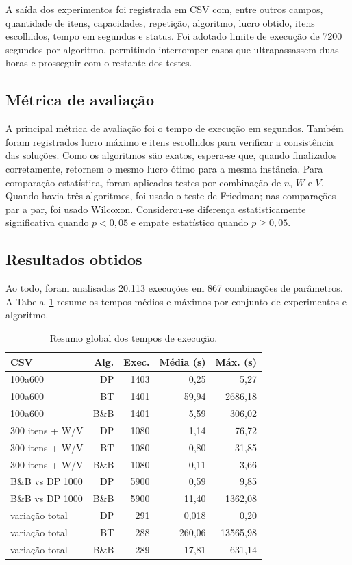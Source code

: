 \documentclass[
    12pt,
    oneside,
    a4paper,
    brazil,
    article
]{abntex2}
\begin{document}
A saída dos experimentos foi registrada em CSV com, entre outros campos, quantidade de itens, capacidades, repetição, algoritmo, lucro obtido, itens escolhidos, tempo em segundos e status. Foi adotado limite de execução de 7200 segundos por algoritmo, permitindo interromper casos que ultrapassassem duas horas e prosseguir com o restante dos testes.

\subsection{Métrica de avaliação}

A principal métrica de avaliação foi o tempo de execução em segundos. Também foram registrados lucro máximo e itens escolhidos para verificar a consistência das soluções. Como os algoritmos são exatos, espera-se que, quando finalizados corretamente, retornem o mesmo lucro ótimo para a mesma instância. Para comparação estatística, foram aplicados testes por combinação de $n$, $W$ e $V$. Quando havia três algoritmos, foi usado o teste de Friedman; nas comparações par a par, foi usado Wilcoxon. Considerou-se diferença estatisticamente significativa quando $p < 0{,}05$ e empate estatístico quando $p \geq 0{,}05$.

\subsection{Resultados obtidos}

Ao todo, foram analisadas 20.113 execuções em 867 combinações de parâmetros. A Tabela~\ref{tab:resumo} resume os tempos médios e máximos por conjunto de experimentos e algoritmo.

\begin{table}[h]
\centering
\caption{Resumo global dos tempos de execução.}
\label{tab:resumo}
\small
\begin{tabular}{lrrrr}
\toprule
\textbf{CSV} & \textbf{Alg.} & \textbf{Exec.} & \textbf{Média (s)} & \textbf{Máx. (s)} \\
\midrule
100a600 & DP & 1403 & 0,25 & 5,27 \\
100a600 & BT & 1401 & 59,94 & 2686,18 \\
100a600 & B\&B & 1401 & 5,59 & 306,02 \\
\midrule
300 itens + W/V & DP & 1080 & 1,14 & 76,72 \\
300 itens + W/V & BT & 1080 & 0,80 & 31,85 \\
300 itens + W/V & B\&B & 1080 & 0,11 & 3,66 \\
\midrule
B\&B vs DP 1000 & DP & 5900 & 0,59 & 9,85 \\
B\&B vs DP 1000 & B\&B & 5900 & 11,40 & 1362,08 \\
\midrule
variação total & DP & 291 & 0,018 & 0,20 \\
variação total & BT & 288 & 260,06 & 13565,98 \\
variação total & B\&B & 289 & 17,81 & 631,14 \\
\bottomrule
\end{tabular}
\end{table}
\end{document}
